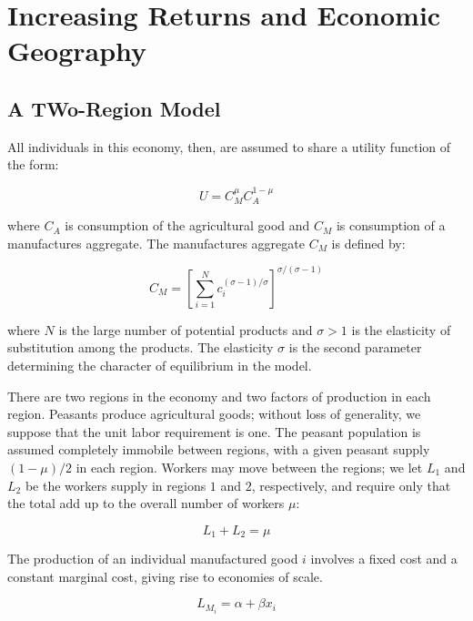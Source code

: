 \chapter{Increasing Returns and Economic Geography}

\section{A TWo-Region Model}

All individuals in this economy, then, are assumed to share a utility function of the form:

\begin{equation}
    U = C_M^{\mu} C_A^{1 - \mu}
\end{equation}

where $C_A$ is consumption of the agricultural good and $C_M$ is consumption of a manufactures aggregate. The manufactures aggregate $C_M$ is defined by:

\begin{equation}
    C_M = \left[ \sum_{i=1}^N c_i^{(\sigma - 1)/\sigma}\right]^{\sigma/(\sigma - 1)}
\end{equation}

where $N$ is the large number of potential products and $\sigma > 1$ is the elasticity of substitution among the products. The elasticity $\sigma$ is the second parameter determining the character of equilibrium in the model.

There are two regions in the economy and two factors of production in each region. Peasants produce agricultural goods; without loss of generality, we suppose that the unit labor requirement is one. The peasant population is assumed completely immobile between regions, with a given peasant supply $(1 - \mu) / 2$ in each region. Workers may move between the regions; we let $L_1$ and $L_2$ be the workers supply in regions $1$ and $2$, respectively, and require only that the total add up to the overall number of workers $\mu$:

\begin{equation}
    L_1 + L_2 = \mu
\end{equation}

The production of an individual manufactured good $i$ involves a fixed cost and a constant marginal cost, giving rise to economies of scale.

\begin{equation}
    L_{M_i} = \alpha + \beta x_i
\end{equation}

